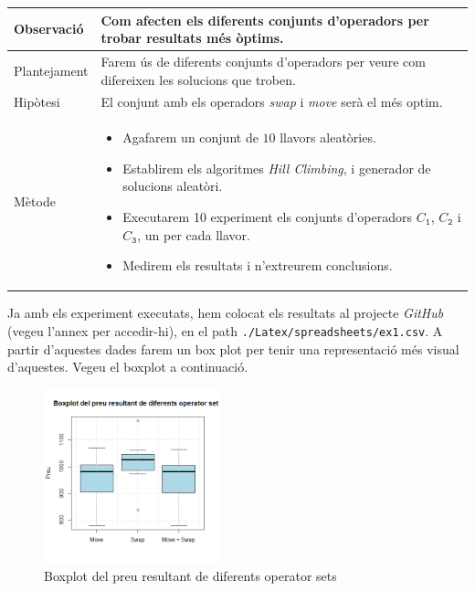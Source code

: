 \documentclass[a4paper]{article}
\begin{document}
	\begin{table}[ht]
		\centering
		\begin{tabular}{|l|p{10cm}|}
			\hline
			Observació & Com afecten els diferents conjunts d'operadors per trobar resultats més òptims. \\
			\hline
			Plantejament & Farem ús de diferents conjunts d'operadors per veure com difereixen les solucions que troben. \\
			\hline
			Hipòtesi & El conjunt amb els operadors \textit{swap} i \textit{move} serà el més optim. \\
			\hline
			Mètode & 
			\begin{itemize}
				\item Agafarem un conjunt de $10$ llavors aleatòries.
				\item Establirem els algoritmes \textit{Hill Climbing}, i generador de solucions aleatòri.
				\item Executarem 10 experiment els conjunts d'operadors $C_{\texttt{1}}$, $C_{\texttt{2}}$ i $C_{\texttt{3}}$, un per cada llavor.
				\item Medirem els resultats i n'extreurem conclusions.
			\end{itemize} \\
			\hline
		\end{tabular}
		\label{tab:exp1_apartats}
	\end{table}
	
	Ja amb els experiment executats, hem colocat els resultats al projecte \textit{GitHub} (vegeu l'annex per accedir-hi), en el path \texttt{./Latex/spreadsheets/ex1.csv}. A partir d'aquestes dades farem un box plot per tenir una representació més visual d'aquestes. Vegeu el boxplot a continuació.
	
	\begin{figure}[H]
		\centering
		\includegraphics[width=0.45\textwidth]{images/exp1_boxplot.png}
		\caption{Boxplot del preu resultant de diferents operator sets}
		\label{fig:exp1_boxplot}
	\end{figure}
	
\end{document}
